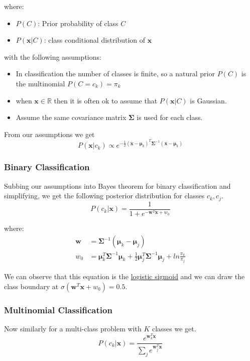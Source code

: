 \documentclass[12pt]{article}
\begin{document}
        where:
        \begin{itemize}
            \item $P(C)$: Prior probability of class $C$
            \item $P(\boldsymbol{x}|C)$: class conditional distribution of $\boldsymbol{x}$
        \end{itemize}

        with the following assumptions:
        \begin{itemize}
            \item In classification the number of classes is finite, so a natural prior $P(C)$ is the multinomial $P(C = c_k) = \pi_k$
            \item when $\boldsymbol{x} \in \mathbb{R}$ then it is often ok to assume that $P(\boldsymbol{x}|C)$ is Gaussian.
            \item Assume the same covariance matrix $\boldsymbol{\Sigma}$ is used for each class.
        \end{itemize}

        From our assumptions we get
        $$P(\boldsymbol{x}|c_k) \propto e^{-\frac{1}{2}(\boldsymbol{x} - \boldsymbol{\mu}_k)^T \boldsymbol{\Sigma}^{-1}(\boldsymbol{x} - \boldsymbol{\mu}_k)} $$


        \subsubsection{Binary Classification}
        Subbing our assumptions into Bayes theorem for binary classification and simplifying, we get the following posterior distribution for classes $c_k, c_j$.
        $$ P(c_k|\boldsymbol{x}) = \frac{1}{1+e^{-\boldsymbol{w}^T\boldsymbol{x} + w_0}} $$

        where:
        \begin{align*}
            \boldsymbol{w} &= \boldsymbol{\Sigma}^{-1}(\boldsymbol{\mu}_k - \boldsymbol{\mu}_j) \\
            w_0 &= \boldsymbol{\mu}^T_k \boldsymbol{\Sigma}^{-1}\boldsymbol{\mu}_k + \frac{1}{2}\boldsymbol{\mu}^T_j\boldsymbol{\Sigma}^{-1}\boldsymbol{\mu}_j + ln\frac{\pi_k}{\pi_j}
        \end{align*}

        We can observe that this equation is the \hyperlink{Sigmoid Function}{logistic sigmoid} and we can draw the class boundary at $\sigma(\boldsymbol{w}^T\boldsymbol{x} + w_0) = 0.5$.
        
        \subsubsection{Multinomial Classification}
        Now similarly for a multi-class problem with $K$ classes we get.
        $$ P(c_k | \boldsymbol{x}) = \frac{e^{\boldsymbol{w}^T_k\boldsymbol{x}}}{\sum_j e^{\boldsymbol{w}^T_j\boldsymbol{x}}} $$
\end{document}
